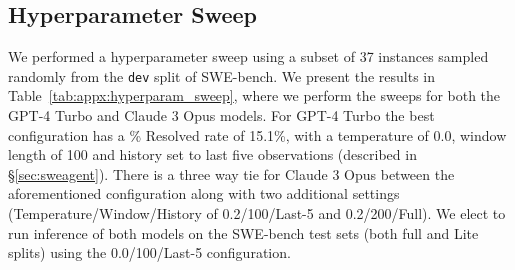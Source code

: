 \subsection{Hyperparameter Sweep}
\label{appx:analyses:hyperparameter_sweep}
We performed a hyperparameter sweep using a subset of 37 instances sampled randomly from the \texttt{dev} split of SWE-bench.
We present the results in Table~\ref{tab:appx:hyperparam_sweep}, where we perform the sweeps for both the GPT-4 Turbo and Claude 3 Opus models.
For GPT-4 Turbo the best configuration has a \% Resolved rate of \num{15.1}\%, with a temperature of \num{0.0}, window length of \num{100} and history set to last five observations (described in \S\ref{sec:sweagent}).
There is a three way tie for Claude 3 Opus between the aforementioned configuration along with two additional settings (Temperature/Window/History of \num{0.2}/\num{100}/Last-5 and \num{0.2}/\num{200}/Full).
We elect to run inference of both models on the SWE-bench test sets (both full and Lite splits) using the \num{0.0}/\num{100}/Last-5 configuration.

